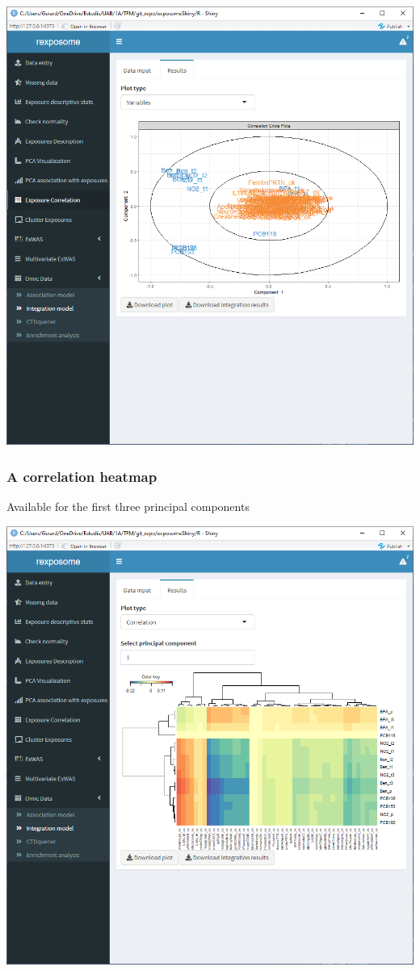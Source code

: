 \documentclass[
]{book}
\begin{document}
\includegraphics{images/analysis12_6.png}

\hypertarget{a-correlation-heatmap}{%
\subsubsection{A correlation heatmap}\label{a-correlation-heatmap}}

Available for the first three principal components

\includegraphics{images/analysis12_7.png}
\end{document}
